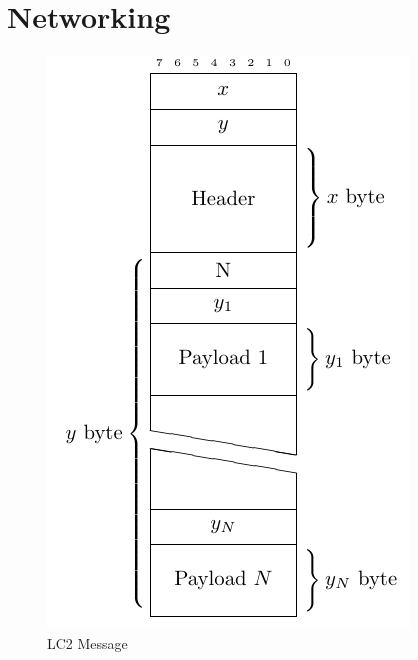 \section{Networking}
\label{ch:networking}

\begin{figure}[h!]
  \centering
  \includegraphics{bin/assets/binary-message-format.pdf}
  \caption{LC2 Message}
  \label{fig:lc2binary}
\end{figure}

\clearpage
